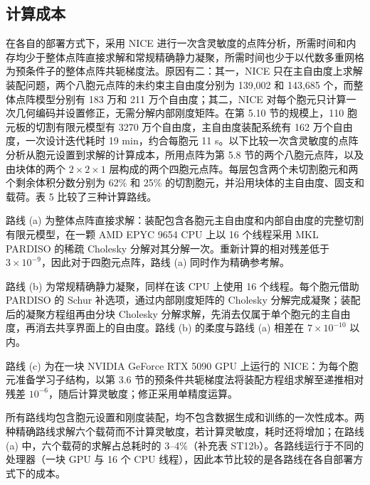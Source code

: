 \documentclass[preprint,12pt,authoryear]{elsarticle}
\begin{document}
\subsection{计算成本}

在各自的部署方式下，采用 NICE 进行一次含灵敏度的点阵分析，所需时间和内存均少于整体点阵直接求解和常规精确静力凝聚，所需时间也少于以代数多重网格为预条件子的整体点阵共轭梯度法。原因有二：其一，NICE 只在主自由度上求解装配问题，两个八胞元点阵的未约束主自由度分别为 139,002 和 143,685 个，而整体点阵模型分别有 183 万和 211 万个自由度；其二，NICE 对每个胞元只计算一次几何编码并设置修正，无需分解内部刚度矩阵。在第 5.10 节的规模上，110 胞元板的切割有限元模型有 3270 万个自由度，主自由度装配系统有 162 万个自由度，一次设计迭代耗时 19 min，约合每胞元 11 s。以下比较一次含灵敏度的点阵分析从胞元设置到求解的计算成本，所用点阵为第 5.8 节的两个八胞元点阵，以及由块体的两个 \(2\times2\times1\) 层构成的两个四胞元点阵。每层包含两个未切割胞元和两个剩余体积分数分别为 62\% 和 25\% 的切割胞元，并沿用块体的主自由度、固支和载荷。表 5 比较了三种计算路线。

路线 (a) 为整体点阵直接求解：装配包含各胞元主自由度和内部自由度的完整切割有限元模型，在一颗 AMD EPYC 9654 CPU 上以 16 个线程采用 MKL PARDISO 的稀疏 Cholesky 分解对其分解一次。重新计算的相对残差低于 \(3\times10^{-9}\)，因此对于四胞元点阵，路线 (a) 同时作为精确参考解。

路线 (b) 为常规精确静力凝聚，同样在该 CPU 上使用 16 个线程。每个胞元借助 PARDISO 的 Schur 补选项，通过内部刚度矩阵的 Cholesky 分解完成凝聚；装配后的凝聚方程组再由分块 Cholesky 分解求解，先消去仅属于单个胞元的主自由度，再消去共享界面上的自由度。路线 (b) 的柔度与路线 (a) 相差在 \(7\times10^{-10}\) 以内。

路线 (c) 为在一块 NVIDIA GeForce RTX 5090 GPU 上运行的 NICE：为每个胞元准备学习子结构，以第 3.6 节的预条件共轭梯度法将装配方程组求解至递推相对残差 \(10^{-6}\)，随后计算灵敏度；修正采用单精度运算。

所有路线均包含胞元设置和刚度装配，均不包含数据生成和训练的一次性成本。两种精确路线求解六个载荷而不计算灵敏度，若计算灵敏度，耗时还将增加；在路线 (a) 中，六个载荷的求解占总耗时的 3--4\%（补充表 ST12b）。各路线运行于不同的处理器（一块 GPU 与 16 个 CPU 线程），因此本节比较的是各路线在各自部署方式下的成本。
\end{document}
